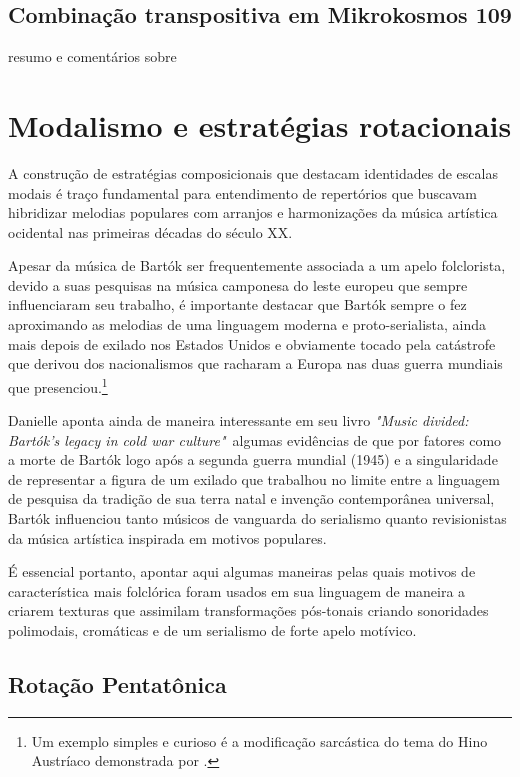 \documentclass[
	12pt,				%
	openright,			%
	twoside,			%
	a4paper,			%
	english,			%
	french,				%
	spanish,			%
	brazil				%
	]{abntex2}
\begin{document}
\subsection{Combinação transpositiva em Mikrokosmos 109}

resumo e comentários sobre \cite[ 272-275]{cohn1991bartok}

\section{Modalismo e estratégias rotacionais}
\label{modalismo}

A construção de estratégias composicionais que destacam identidades de escalas modais é traço fundamental para entendimento de repertórios que buscavam hibridizar melodias populares com arranjos e harmonizações da música artística ocidental nas primeiras décadas do século XX. 

Apesar da música de Bartók ser frequentemente associada a um apelo folclorista, devido a suas pesquisas na música camponesa do leste europeu que sempre influenciaram seu trabalho, é importante destacar que Bartók sempre o fez aproximando as melodias de uma linguagem moderna e proto-serialista, ainda mais depois de exilado nos Estados Unidos e obviamente tocado pela catástrofe que derivou dos nacionalismos que racharam a Europa nas duas guerra mundiais que presenciou.\footnote{Um exemplo simples e curioso é a modificação sarcástica do tema do Hino Austríaco demonstrada por . }

Danielle  aponta ainda de maneira interessante em seu livro \textit{"Music divided: Bartók's legacy in cold war culture"}\ algumas evidências de que por fatores como a morte de Bartók logo após a segunda guerra mundial (1945) e a singularidade de representar a figura de um exilado que trabalhou no limite entre a linguagem de pesquisa da tradição de sua terra natal e invenção contemporânea universal, Bartók influenciou tanto músicos de vanguarda do serialismo quanto revisionistas da música artística inspirada em motivos populares.

É essencial portanto, apontar aqui algumas maneiras pelas quais motivos de característica mais folclórica foram usados em sua linguagem de maneira a criarem texturas que assimilam transformações pós-tonais criando sonoridades polimodais, cromáticas e de um serialismo de forte apelo motívico.


\subsection{Rotação Pentatônica}
 
\end{document}
